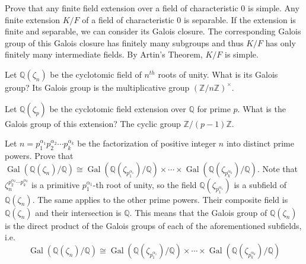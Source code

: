 \documentclass[avery5371,grid]{flashcards}
\newcommand{\Z}{\mathbb{Z}}
\newcommand{\Q}{\mathbb{Q}}
\DeclareMathOperator{\Gal}{Gal}
\begin{document}
\begin{flashcard}[Fields]{Prove that any finite field extension over a field of characteristic 0 is simple.}
 Any finite extension $K/F$ of a field of characteristic 0 is separable. If the extension is finite and separable, we can consider its Galois closure. The corresponding Galois group of this Galois closure has finitely many subgroups and thus $K/F$ has only finitely many intermediate fields. By Artin's Theorem, $K/F$ is simple.
\end{flashcard}

\begin{flashcard}[Fields]{Let $\Q(\zeta_n)$ be the cyclotomic field of $n^{th}$ roots of unity. What is its Galois group?}
 Its Galois group is the multiplicative group $(\Z/n\Z)^\times$.
\end{flashcard}

\begin{flashcard}[Fields]{Let $\Q(\zeta_p)$ be the cyclotomic field extension over $\Q$ for prime $p$. What is the Galois group of this extension?}
 The cyclic group $\Z/(p-1)\Z$. 
\end{flashcard}

\begin{flashcard}[Fields]{Let $n = p_1^{\alpha_1} p_2^{\alpha_2} \cdots p_k^{\alpha_k}$ be the factorization of positive integer $n$ into distinct prime powers. Prove that $\Gal(\Q(\zeta_n)/\Q) \cong \Gal(\Q(\zeta_{p_1^{\alpha_1}})/\Q) \times \cdots \times \Gal(\Q(\zeta_{p_k^{\alpha_k}})/\Q).$}
 Note that $\zeta_n^{p_2^{\alpha_2} \cdots p_k^{\alpha_k}}$ is a primitive $p_1^{\alpha_1}$-th root of unity, so the field $\Q(\zeta_{p_1^{\alpha_1}})$ is a subfield of $\Q(\zeta_n)$. The same applies to the other prime powers. Their composite field is $\Q(\zeta_n)$ and their intersection is $\Q$. This means that the Galois group of $\Q(\zeta_n)$ is the direct product of the Galois groups of each of the aforementioned subfields, i.e.
 $$
 \Gal(\Q(\zeta_n)/\Q) \cong \Gal(\Q(\zeta_{p_1^{\alpha_1}})/\Q) \times \cdots \times \Gal(\Q(\zeta_{p_k^{\alpha_k}})/\Q)
 $$
\end{flashcard}
\end{document}
